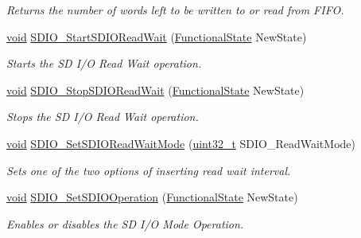 \begin{DoxyCompactItemize}
\begin{DoxyCompactList}\small\item\em Returns the number of words left to be written to or read from F\+I\+FO. \end{DoxyCompactList}\item 
\hyperlink{usb__devapi_8h_afabf60e7f57651d6d595a02c75f07cd0}{void} \hyperlink{group___s_d_i_o___private___functions_gac88f914d9a68a83abc2265ec8a7b79fc}{S\+D\+I\+O\+\_\+\+Start\+S\+D\+I\+O\+Read\+Wait} (\hyperlink{agilefox_2library_2inc_2stm32f10x__type_8h_ac9a7e9a35d2513ec15c3b537aaa4fba1}{Functional\+State} New\+State)
\begin{DoxyCompactList}\small\item\em Starts the SD I/O Read Wait operation. \end{DoxyCompactList}\item 
\hyperlink{usb__devapi_8h_afabf60e7f57651d6d595a02c75f07cd0}{void} \hyperlink{group___s_d_i_o___private___functions_gaca6b25eb2debb73ac827c66f0ebcf837}{S\+D\+I\+O\+\_\+\+Stop\+S\+D\+I\+O\+Read\+Wait} (\hyperlink{agilefox_2library_2inc_2stm32f10x__type_8h_ac9a7e9a35d2513ec15c3b537aaa4fba1}{Functional\+State} New\+State)
\begin{DoxyCompactList}\small\item\em Stops the SD I/O Read Wait operation. \end{DoxyCompactList}\item 
\hyperlink{usb__devapi_8h_afabf60e7f57651d6d595a02c75f07cd0}{void} \hyperlink{group___s_d_i_o___private___functions_ga2baac4ea1bb6c2d94345d2712604338a}{S\+D\+I\+O\+\_\+\+Set\+S\+D\+I\+O\+Read\+Wait\+Mode} (\hyperlink{_p_e___types_8h_a33594304e786b158f3fb30289278f5af}{uint32\+\_\+t} S\+D\+I\+O\+\_\+\+Read\+Wait\+Mode)
\begin{DoxyCompactList}\small\item\em Sets one of the two options of inserting read wait interval. \end{DoxyCompactList}\item 
\hyperlink{usb__devapi_8h_afabf60e7f57651d6d595a02c75f07cd0}{void} \hyperlink{group___s_d_i_o___private___functions_ga24e210c185d5a7855cbaff4472a8f8d1}{S\+D\+I\+O\+\_\+\+Set\+S\+D\+I\+O\+Operation} (\hyperlink{agilefox_2library_2inc_2stm32f10x__type_8h_ac9a7e9a35d2513ec15c3b537aaa4fba1}{Functional\+State} New\+State)
\begin{DoxyCompactList}\small\item\em Enables or disables the SD I/O Mode Operation. \end{DoxyCompactList}\item 

\end{DoxyCompactItemize}

